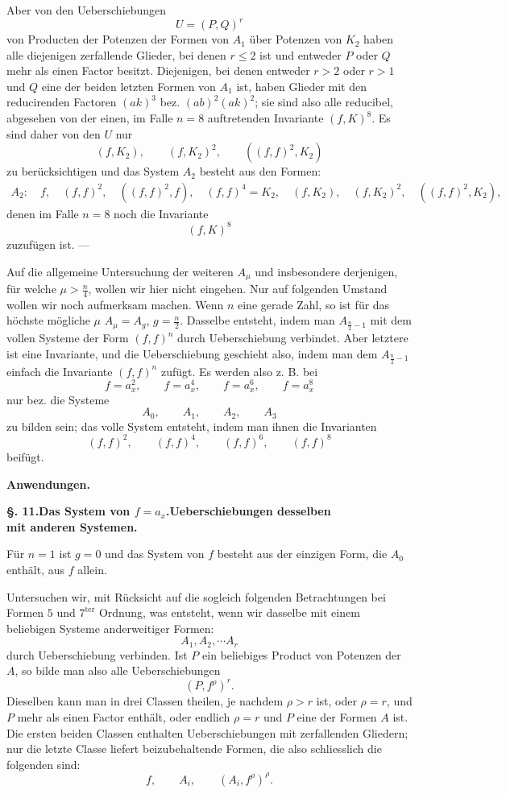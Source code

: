 \documentclass[10pt]{article}
\providecommand{\bdots}{\cdots}
\begin{document}
Aber von den Ueberschiebungen
\[
U=(P,Q)^r
\]
von Producten der Potenzen der Formen von $A_1$ über Potenzen von $K_2$ haben alle diejenigen zerfallende Glieder, bei denen $r\leq 2$ ist und entweder $P$ oder $Q$ mehr als einen Factor besitzt. Diejenigen, bei denen entweder $r>2$ oder $r>1$ und $Q$ eine der beiden letzten Formen von $A_1$ ist, haben Glieder mit den reducirenden Factoren $(ak)^3$ bez. $(ab)^2(ak)^2$; sie sind also alle reducibel, abgesehen von der einen, im Falle $n=8$ auftretenden Invariante $(f,K)^8$. Es sind daher von den $U$ nur
\[
(f,K_2),\qquad (f,K_2)^2,\qquad ((f,f)^2,K_2)
\]
zu berücksichtigen und das System $A_2$ besteht aus den Formen:
\[
\begin{gathered}
A_2:
\quad f,
\quad (f,f)^2,
\quad ((f,f)^2,f),
\quad (f,f)^4=K_2,
\quad (f,K_2),\quad (f,K_2)^2,
\quad ((f,f)^2,K_2),
\end{gathered}
\]
denen im Falle $n=8$ noch die Invariante
\[
(f,K)^8
\]
zuzufügen ist. ---

Auf die allgemeine Untersuchung der weiteren $A_\mu$ und insbesondere derjenigen, für welche $\mu>\frac n4$, wollen wir hier nicht eingehen. Nur auf folgenden Umstand wollen wir noch aufmerksam machen. Wenn $n$ eine gerade Zahl, so ist für das höchste mögliche $\mu$ $A_\mu=A_g$, $g=\frac n2$. Dasselbe entsteht, indem man $A_{\frac n2-1}$ mit dem vollen Systeme der Form $(f,f)^n$ durch Ueberschiebung verbindet. Aber letztere ist eine Invariante, und die Ueberschiebung geschieht also, indem man dem $A_{\frac n2-1}$ einfach die Invariante $(f,f)^n$ zufügt. Es werden also z. B. bei
\[
f=a_x^2,
\qquad f=a_x^4,
\qquad f=a_x^6,
\qquad f=a_x^8
\]
nur bez. die Systeme
\[
A_0,
\qquad A_1,
\qquad A_2,
\qquad A_3
\]
zu bilden sein; das volle System entsteht, indem man ihnen die Invarianten
\[
(f,f)^2,
\qquad (f,f)^4,
\qquad (f,f)^6,
\qquad (f,f)^8
\]
beifügt.

\begin{center}
{\bfseries Anwendungen.}
\end{center}

\begin{center}
{\bfseries §. 11.\quad Das System von $f=a_x$.\quad Ueberschiebungen desselben\\mit anderen Systemen.}
\end{center}

Für $n=1$ ist $g=0$ und das System von $f$ besteht aus der einzigen Form, die $A_0$ enthält, aus $f$ allein.

Untersuchen wir, mit Rücksicht auf die sogleich folgenden Betrachtungen bei Formen $5$ und $7^{\mathrm{ter}}$ Ordnung, was entsteht, wenn wir dasselbe mit einem beliebigen Systeme anderweitiger Formen:
\[
A_1,A_2,\bdots A_r
\]
durch Ueberschiebung verbinden. Ist $P$ ein beliebiges Product von Potenzen der $A$, so bilde man also alle Ueberschiebungen
\[
(P,f^\rho)^r.
\]
Dieselben kann man in drei Classen theilen, je nachdem $\rho>r$ ist, oder $\rho=r$, und $P$ mehr als einen Factor enthält, oder endlich $\rho=r$ und $P$ eine der Formen $A$ ist. Die ersten beiden Classen enthalten Ueberschiebungen mit zerfallenden Gliedern; nur die letzte Classe liefert beizubehaltende Formen, die also schliesslich die folgenden sind:
\[
f,
\qquad A_i,
\qquad (A_i,f^\rho)^\rho.
\]
\end{document}
